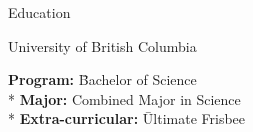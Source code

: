 \documentclass{article}
\newlength{\tabin}
\newlength{\secsep}
\newcommand{\lineunder}{\vspace*{-8pt} \\ \hspace*{-6pt} \hrulefill \\ \vspace*{-15pt}}
\newenvironment{tabbedsection}[1]{
  \begin{list}{}{
      \setlength{\itemsep}{0pt}
      \setlength{\labelsep}{0pt}
      \setlength{\labelwidth}{0pt}
      \setlength{\leftmargin}{\tabin}
      \setlength{\rightmargin}{\tabin}
      \setlength{\listparindent}{0pt}
      \setlength{\parsep}{0pt}
      \setlength{\parskip}{0pt}
      \setlength{\partopsep}{0pt}
      \setlength{\topsep}{#1}
    }
  \item[]
}{\end{list}}
\newenvironment{nospacetabbing}{
    \begin{tabbing}
}{\end{tabbing}\vspace{-1.2em}}
\newenvironment{resume_section}[1]{
  \filbreak
  \vspace{2\secsep}
  \textsc{\large#1}
  \lineunder
  \begin{tabbedsection}{\secsep}
}{\end{tabbedsection}}
\newenvironment{resume_subsection}[2][]{
  \textbf{#2} \hfill {\footnotesize #1} \hspace{-5.1em}
  \begin{tabbedsection}{0.5\secsep}
}{\end{tabbedsection}}
\begin{document}
%
\begin{resume_section}{Education}
  \begin{resume_subsection}[09/2023 - Present]{University of British Columbia}
    \begin{nospacetabbing}
      \textbf{Program:} \= Bachelor of Science\\*
      \textbf{Major:} \> Combined Major in Science \\*
      \textbf{Extra-curricular:} \= Ultimate Frisbee
    \end{nospacetabbing}
  \end{resume_subsection}
\end{resume_section}




  
\end{document}

